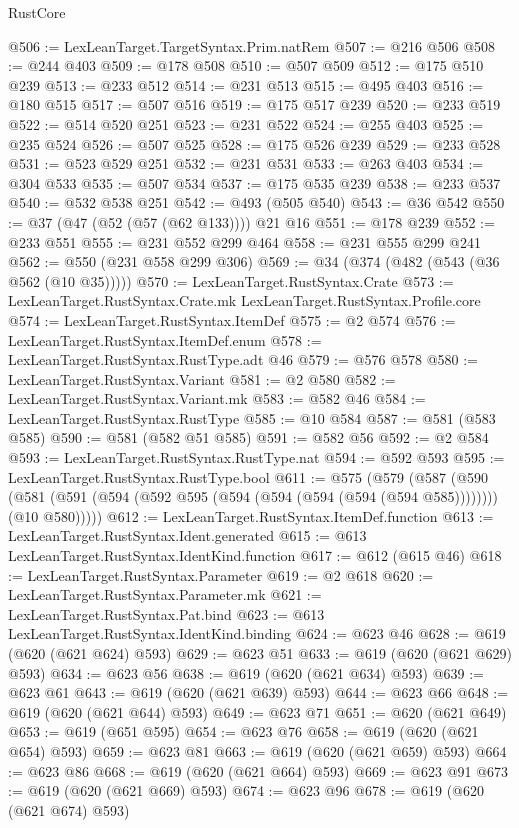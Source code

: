 \begin{lexlean}{RustCore}
\begin{coremodule}
@506 := LexLeanTarget.TargetSyntax.Prim.natRem
@507 := @216 @506
@508 := @244 @403
@509 := @178 @508
@510 := @507 @509
@512 := @175 @510 @239
@513 := @233 @512
@514 := @231 @513
@515 := @495 @403
@516 := @180 @515
@517 := @507 @516
@519 := @175 @517 @239
@520 := @233 @519
@522 := @514 @520 @251
@523 := @231 @522
@524 := @255 @403
@525 := @235 @524
@526 := @507 @525
@528 := @175 @526 @239
@529 := @233 @528
@531 := @523 @529 @251
@532 := @231 @531
@533 := @263 @403
@534 := @304 @533
@535 := @507 @534
@537 := @175 @535 @239
@538 := @233 @537
@540 := @532 @538 @251
@542 := @493 (@505 @540)
@543 := @36 @542
@550 := @37 (@47 (@52 (@57 (@62 @133)))) @21 @16
@551 := @178 @239
@552 := @233 @551
@555 := @231 @552 @299 @464
@558 := @231 @555 @299 @241
@562 := @550 (@231 @558 @299 @306)
@569 := @34 (@374 (@482 (@543 (@36 @562 (@10 @35)))))
@570 := LexLeanTarget.RustSyntax.Crate
@573 := LexLeanTarget.RustSyntax.Crate.mk LexLeanTarget.RustSyntax.Profile.core
@574 := LexLeanTarget.RustSyntax.ItemDef
@575 := @2 @574
@576 := LexLeanTarget.RustSyntax.ItemDef.enum
@578 := LexLeanTarget.RustSyntax.RustType.adt @46
@579 := @576 @578
@580 := LexLeanTarget.RustSyntax.Variant
@581 := @2 @580
@582 := LexLeanTarget.RustSyntax.Variant.mk
@583 := @582 @46
@584 := LexLeanTarget.RustSyntax.RustType
@585 := @10 @584
@587 := @581 (@583 @585)
@590 := @581 (@582 @51 @585)
@591 := @582 @56
@592 := @2 @584
@593 := LexLeanTarget.RustSyntax.RustType.nat
@594 := @592 @593
@595 := LexLeanTarget.RustSyntax.RustType.bool
@611 := @575
    (@579
      (@587
        (@590 (@581 (@591 (@594 (@592 @595 (@594 (@594 (@594 (@594 (@594 @585)))))))) (@10 @580)))))
@612 := LexLeanTarget.RustSyntax.ItemDef.function
@613 := LexLeanTarget.RustSyntax.Ident.generated
@615 := @613 LexLeanTarget.RustSyntax.IdentKind.function
@617 := @612 (@615 @46)
@618 := LexLeanTarget.RustSyntax.Parameter
@619 := @2 @618
@620 := LexLeanTarget.RustSyntax.Parameter.mk
@621 := LexLeanTarget.RustSyntax.Pat.bind
@623 := @613 LexLeanTarget.RustSyntax.IdentKind.binding
@624 := @623 @46
@628 := @619 (@620 (@621 @624) @593)
@629 := @623 @51
@633 := @619 (@620 (@621 @629) @593)
@634 := @623 @56
@638 := @619 (@620 (@621 @634) @593)
@639 := @623 @61
@643 := @619 (@620 (@621 @639) @593)
@644 := @623 @66
@648 := @619 (@620 (@621 @644) @593)
@649 := @623 @71
@651 := @620 (@621 @649)
@653 := @619 (@651 @595)
@654 := @623 @76
@658 := @619 (@620 (@621 @654) @593)
@659 := @623 @81
@663 := @619 (@620 (@621 @659) @593)
@664 := @623 @86
@668 := @619 (@620 (@621 @664) @593)
@669 := @623 @91
@673 := @619 (@620 (@621 @669) @593)
@674 := @623 @96
@678 := @619 (@620 (@621 @674) @593)

\end{coremodule}
\end{lexlean}
